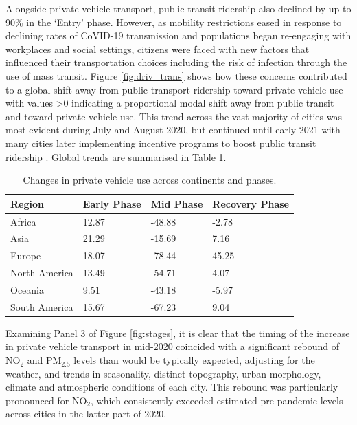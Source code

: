 \documentclass[preprint,12pt]{elsarticle}
\begin{document}
Alongside private vehicle transport, public transit ridership also declined by up to 90\% in the `Entry' phase\cite{TransitCovid_Gkiotsalitis}. However, as mobility restrictions eased in response to declining rates of CoVID-19 transmission and populations began re-engaging with workplaces and social settings, citizens were faced with new factors that influenced their transportation choices including the risk of infection through the use of mass transit\cite{BECKTransit}. Figure \ref{fig:driv_trans} shows how these concerns contributed to a global shift away from public transport ridership toward private vehicle use with values \textgreater 0 indicating a proportional modal shift away from public transit and toward private vehicle use. This trend across the vast majority of cities was most evident during July and August 2020, but continued until early 2021 with many cities later implementing incentive programs to boost public transit ridership \cite{dai2021improving}. Global trends are summarised in Table \ref{tab:driving}.

\begin{table}
\caption{Changes in private vehicle use across continents and phases.}
\begin{tabular}{ |l|l|l|l| }
\hline
Region & Early Phase & Mid Phase & Recovery Phase  \\ \hline
\hline
Africa         & 12.87 & -48.88 &  -2.78  \\ \hline
Asia           & 21.29 & -15.69 &   7.16  \\ \hline
Europe         & 18.07 & -78.44 &  45.25  \\ \hline
North America  & 13.49 & -54.71 & 4.07  \\ \hline
Oceania        &  9.51 & -43.18 & -5.97  \\ \hline
South America  & 15.67 & -67.23 & 9.04  \\ \hline
\end{tabular}\label{tab:driving}
\end{table}

Examining Panel 3 of Figure \ref{fig:stages}, it is clear that the timing of the increase in private vehicle transport in mid-2020 coincided with a significant rebound of NO$_{2}$ and PM$_{2.5}$ levels than would be typically expected, adjusting for the weather, and trends in seasonality, distinct topography, urban morphology, climate and atmospheric conditions of each city\cite{Wijnands2022}. This rebound was particularly pronounced for NO$_{2}$, which consistently exceeded estimated pre-pandemic levels across cities in the latter part of 2020.
\end{document}
